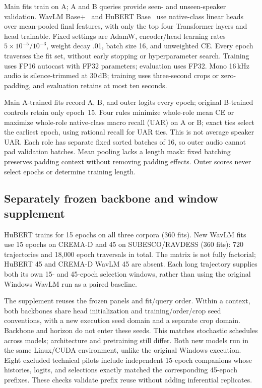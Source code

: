 \documentclass[letterpaper]{article}
\begin{document}
Main fits train on A; A and B queries provide seen- and unseen-speaker validation. WavLM Base+~\cite{wavlm} and HuBERT Base~\cite{hubert} use native-class linear heads over mean-pooled final features, with only the top four Transformer layers and head trainable. Fixed settings are AdamW, encoder/head learning rates $5\times10^{-5}/10^{-3}$, weight decay .01, batch size 16, and unweighted CE. Every epoch traverses the fit set, without early stopping or hyperparameter search. Training uses FP16 autocast with FP32 parameters; evaluation uses FP32. Mono 16\,kHz audio is silence-trimmed at 30\,dB; training uses three-second crops or zero-padding, and evaluation retains at most ten seconds.

Main A-trained fits record A, B, and outer logits every epoch; original B-trained controls retain only epoch~15. Four rules minimize whole-role mean CE or maximize whole-role native-class macro recall (UAR) on A or B; exact ties select the earliest epoch, using rational recall for UAR ties. This is not average speaker UAR. Each role has separate fixed sorted batches of 16, so outer audio cannot pad validation batches. Mean pooling lacks a length mask: fixed batching preserves padding context without removing padding effects. Outer scores never select epochs or determine training length.

\subsection{Separately frozen backbone and window supplement}
HuBERT trains for 15 epochs on all three corpora (360 fits). New WavLM fits use 15 epochs on CREMA-D and 45 on SUBESCO/RAVDESS (360 fits): 720 trajectories and 18,000 epoch traversals in total. The matrix is not fully factorial; HuBERT 45 and CREMA-D WavLM 45 are absent. Each long trajectory supplies both its own 15- and 45-epoch selection windows, rather than using the original Windows WavLM run as a paired baseline.

The supplement reuses the frozen panels and fit/query order. Within a context, both backbones share head initialization and training/order/crop seed conventions, with a new execution seed domain and a separate crop domain. Backbone and horizon do not enter these seeds. This matches stochastic schedules across models; architecture and pretraining still differ. Both new models run in the same Linux/CUDA environment, unlike the original Windows execution. Eight excluded technical pilots include independent 15-epoch companions whose histories, logits, and selections exactly matched the corresponding 45-epoch prefixes. These checks validate prefix reuse without adding inferential replicates.
\end{document}
